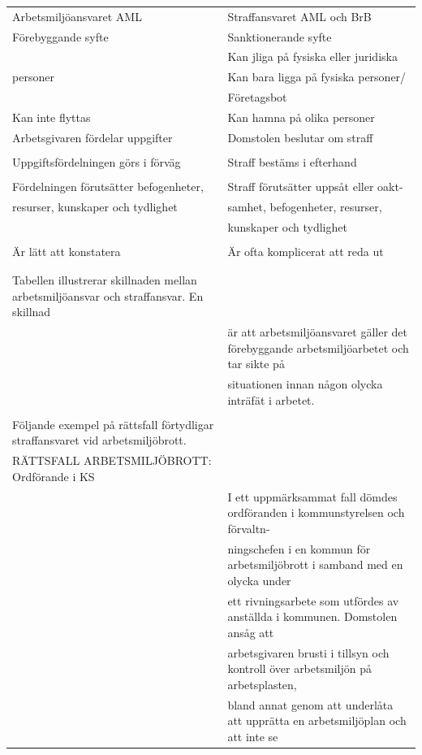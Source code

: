 \begin{tabular}{ll} 
Arbetsmiljöansvaret AML & Straffansvaret AML och BrB \\
Förebyggande syfte & Sanktionerande syfte \\
& Kan jliga på fysiska eller juridiska \\
personer & Kan bara ligga på fysiska personer/ \\
& Företagsbot \\
Kan inte flyttas & Kan hamna på olika personer \\
Arbetsgivaren fördelar uppgifter & Domstolen beslutar om straff \\
& \\
Uppgiftsfördelningen görs i förväg & Straff bestäms i efterhand \\
& \\
Fördelningen förutsätter befogenheter, & Straff förutsätter uppsåt eller oakt- \\
resurser, kunskaper och tydlighet & samhet, befogenheter, resurser, \\
& kunskaper och tydlighet \\
& \\
Är lätt att konstatera & Är ofta komplicerat att reda ut \\
& \\
& \\
Tabellen illustrerar skillnaden mellan arbetsmiljöansvar och straffansvar. En skillnad \\
& är att arbetsmiljöansvaret gäller det förebyggande arbetsmiljöarbetet och tar sikte på \\
& situationen innan någon olycka inträfät i arbetet. \\
& \\
Följande exempel på rättsfall förtydligar straffansvaret vid arbetsmiljöbrott. \\
RÄTTSFALL ARBETSMILJÖBROTT: Ordförande i KS \\
& I ett uppmärksammat fall dömdes ordföranden i kommunstyrelsen och förvaltn- \\
&ningschefen i en kommun för arbetsmiljöbrott i samband med en olycka under \\
& ett rivningsarbete som utfördes av anställda i kommunen. Domstolen ansåg att \\
& arbetsgivaren brusti i tillsyn och kontroll över arbetsmiljön på arbetsplasten, \\
& bland annat genom att underlåta att upprätta en arbetsmiljöplan och att inte se \\

\end{tabular}
